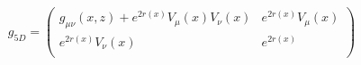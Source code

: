 \begin{equation}
g_{5 D} = \left( \begin{array}{cc} g_{\mu \nu} ( x , z ) + e^{2 r ( x )}
V_{\mu} ( x ) V_{\nu} ( x ) & e^{2 r ( x )} V_{\mu} ( x )\\ e^{2 r ( x )}
V_{\nu} ( x ) & e^{2 r ( x )}\\ \end{array} \right)  \label{l5d4d}
\end{equation}

